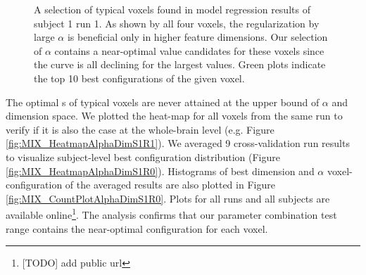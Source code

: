 \begin{figure}
    \centering
    \caption[Typical-Voxels' Response to \(\alpha\) and Dimension]{A selection of typical voxels found in  model regression results of subject 1 run 1. As shown by all four voxels, the regularization by large \(\alpha\) is beneficial only in higher feature dimensions. Our selection of \(\alpha\) contains a near-optimal value candidates for these voxels since the curve is all declining for the largest values. Green plots indicate the top 10 best configurations of the given voxel.} 
    \label{fig:TypicalVoxelDistributionS1R1}
\end{figure}

The optimal s of typical voxels are never attained at the upper bound of \(\alpha\) and dimension space. We plotted the heat-map for all voxels from the same run to verify if it is also the case at the whole-brain level (e.g. Figure \ref{fig:MIX_HeatmapAlphaDimS1R1}). We averaged 9 cross-validation run results to visualize subject-level best configuration distribution (Figure \ref{fig:MIX_HeatmapAlphaDimS1R0}). Histograms of best dimension and \(\alpha\) voxel-configuration of the averaged results are also plotted in Figure \ref{fig:MIX_CountPlotAlphaDimS1R0}. Plots for all runs and all subjects are available online\footnote{[TODO] add public url}. The analysis confirms that our parameter combination test range contains the near-optimal configuration for each voxel.

